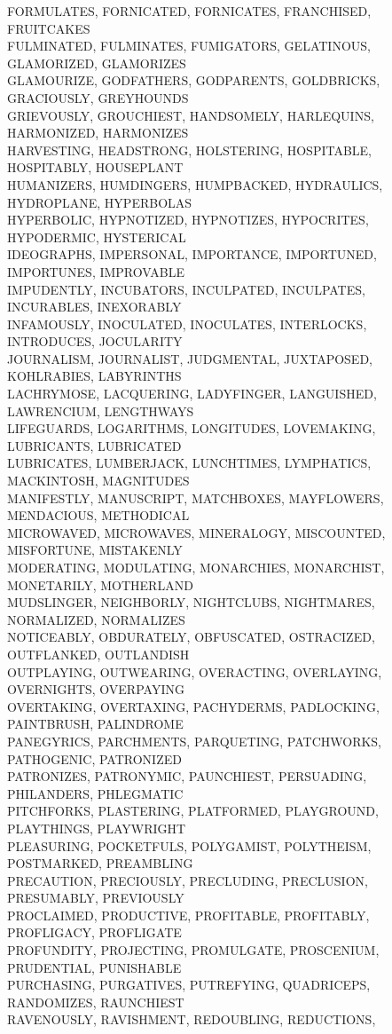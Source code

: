 FORMULATES, FORNICATED, FORNICATES, FRANCHISED, FRUITCAKES\\FULMINATED, FULMINATES, FUMIGATORS, GELATINOUS, GLAMORIZED, GLAMORIZES\\GLAMOURIZE, GODFATHERS, GODPARENTS, GOLDBRICKS, GRACIOUSLY, GREYHOUNDS\\GRIEVOUSLY, GROUCHIEST, HANDSOMELY, HARLEQUINS, HARMONIZED, HARMONIZES\\HARVESTING, HEADSTRONG, HOLSTERING, HOSPITABLE, HOSPITABLY, HOUSEPLANT\\HUMANIZERS, HUMDINGERS, HUMPBACKED, HYDRAULICS, HYDROPLANE, HYPERBOLAS\\HYPERBOLIC, HYPNOTIZED, HYPNOTIZES, HYPOCRITES, HYPODERMIC, HYSTERICAL\\IDEOGRAPHS, IMPERSONAL, IMPORTANCE, IMPORTUNED, IMPORTUNES, IMPROVABLE\\IMPUDENTLY, INCUBATORS, INCULPATED, INCULPATES, INCURABLES, INEXORABLY\\INFAMOUSLY, INOCULATED, INOCULATES, INTERLOCKS, INTRODUCES, JOCULARITY\\JOURNALISM, JOURNALIST, JUDGMENTAL, JUXTAPOSED, KOHLRABIES, LABYRINTHS\\LACHRYMOSE, LACQUERING, LADYFINGER, LANGUISHED, LAWRENCIUM, LENGTHWAYS\\LIFEGUARDS, LOGARITHMS, LONGITUDES, LOVEMAKING, LUBRICANTS, LUBRICATED\\LUBRICATES, LUMBERJACK, LUNCHTIMES, LYMPHATICS, MACKINTOSH, MAGNITUDES\\MANIFESTLY, MANUSCRIPT, MATCHBOXES, MAYFLOWERS, MENDACIOUS, METHODICAL\\MICROWAVED, MICROWAVES, MINERALOGY, MISCOUNTED, MISFORTUNE, MISTAKENLY\\MODERATING, MODULATING, MONARCHIES, MONARCHIST, MONETARILY, MOTHERLAND\\MUDSLINGER, NEIGHBORLY, NIGHTCLUBS, NIGHTMARES, NORMALIZED, NORMALIZES\\NOTICEABLY, OBDURATELY, OBFUSCATED, OSTRACIZED, OUTFLANKED, OUTLANDISH\\OUTPLAYING, OUTWEARING, OVERACTING, OVERLAYING, OVERNIGHTS, OVERPAYING\\OVERTAKING, OVERTAXING, PACHYDERMS, PADLOCKING, PAINTBRUSH, PALINDROME\\PANEGYRICS, PARCHMENTS, PARQUETING, PATCHWORKS, PATHOGENIC, PATRONIZED\\PATRONIZES, PATRONYMIC, PAUNCHIEST, PERSUADING, PHILANDERS, PHLEGMATIC\\PITCHFORKS, PLASTERING, PLATFORMED, PLAYGROUND, PLAYTHINGS, PLAYWRIGHT\\PLEASURING, POCKETFULS, POLYGAMIST, POLYTHEISM, POSTMARKED, PREAMBLING\\PRECAUTION, PRECIOUSLY, PRECLUDING, PRECLUSION, PRESUMABLY, PREVIOUSLY\\PROCLAIMED, PRODUCTIVE, PROFITABLE, PROFITABLY, PROFLIGACY, PROFLIGATE\\PROFUNDITY, PROJECTING, PROMULGATE, PROSCENIUM, PRUDENTIAL, PUNISHABLE\\PURCHASING, PURGATIVES, PUTREFYING, QUADRICEPS, RANDOMIZES, RAUNCHIEST\\RAVENOUSLY, RAVISHMENT, REDOUBLING, REDUCTIONS, 